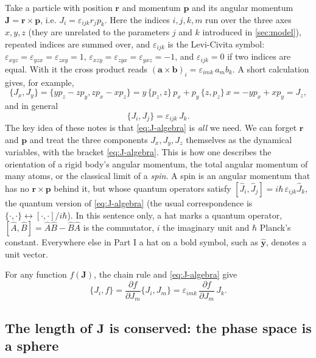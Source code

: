 \documentclass[11pt,a4paper]{article}
\newcommand{\vJ}{\bm{J}}
\newcommand{\PB}[2]{\{#1,#2\}}
\begin{document}
Take a particle with position $\bm r$ and momentum $\bm p$ and its angular momentum $\vJ = \bm r \times \bm p$, i.e.
$J_i = \varepsilon_{ijk} r_j p_k$. Here the indices $i,j,k,m$ run over the three axes $x,y,z$ (they are unrelated to
the parameters $j$ and $k$ introduced in \cref{sec:model}), repeated indices are summed over, and $\varepsilon_{ijk}$ is the
Levi-Civita symbol: $\varepsilon_{xyz} = \varepsilon_{yzx} = \varepsilon_{zxy} = 1$, $\varepsilon_{xzy} = \varepsilon_{zyx} =
\varepsilon_{yxz} = -1$, and $\varepsilon_{ijk} = 0$ if two indices are equal. With it the cross product reads $(\bm a\times
\bm b)_i = \varepsilon_{imk}\,a_m b_k$. A short calculation gives, for example,
\begin{equation*}
  \PB{J_x}{J_y} = \PB{y p_z - z p_y}{z p_x - x p_z}
  = y\,\PB{p_z}{z}\,p_x + p_y\,\PB{z}{p_z}\,x = -y p_x + x p_y = J_z ,
\end{equation*}
and in general
\begin{equation}\label{eq:J-algebra}
  \boxed{\PB{J_i}{J_j} = \varepsilon_{ijk}\, J_k .}
\end{equation}
The key idea of these notes is that \eqref{eq:J-algebra} is \emph{all} we need. We can forget $\bm r$ and $\bm p$
and treat the three components $J_x, J_y, J_z$ themselves as the dynamical variables, with the bracket
\eqref{eq:J-algebra}. This is how one describes the orientation of a rigid body's angular momentum, the total angular
momentum of many atoms, or the classical limit of a \emph{spin}. A spin is an angular momentum that has no
$\bm r \times \bm p$ behind it, but whose quantum operators satisfy $[\hat J_i,\hat J_j] = i\hbar\,\varepsilon_{ijk}\hat
J_k$, the quantum version of \eqref{eq:J-algebra} (the usual correspondence is $\PB{\cdot}{\cdot} \leftrightarrow
[\cdot,\cdot]/i\hbar$). In this sentence only, a hat marks a quantum operator, $[\hat A,\hat B] = \hat A\hat B -
\hat B\hat A$ is the commutator, $i$ the imaginary unit and $\hbar$ Planck's constant. Everywhere else in Part I a hat
on a bold symbol, such as $\hat{\bm y}$, denotes a unit vector.

For any function $f(\vJ)$, the chain rule and \eqref{eq:J-algebra} give
\begin{equation}\label{eq:J-f-bracket}
  \PB{J_i}{f} = \frac{\partial f}{\partial J_m}\PB{J_i}{J_m} = \varepsilon_{imk}\,\frac{\partial f}{\partial J_m}\, J_k .
\end{equation}

\subsection{The length of \texorpdfstring{$\vJ$}{J} is conserved: the phase space is a sphere}
\end{document}
